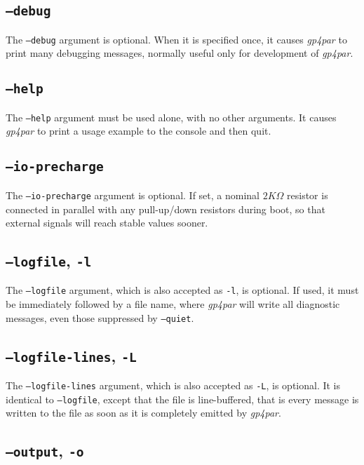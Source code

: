 \documentclass[11pt]{article}
\newcommand{\namestyle}[1]{\textit{#1}}
\begin{document}
\subsection{\texttt{--debug}}

The \texttt{--debug} argument is optional. When it is specified once, it causes \namestyle{gp4par} to print
many debugging messages, normally useful only for development of \namestyle{gp4par}.

\subsection{\texttt{--help}}

The \texttt{--help} argument must be used alone, with no other arguments. It causes \namestyle{gp4par} to print a usage
example to the console and then quit.

\subsection{\texttt{--io-precharge}}

The \texttt{--io-precharge} argument is optional. If set, a nominal $2K \Omega$ resistor is connected in parallel with any
pull-up/down resistors during boot, so that external signals will reach stable values sooner.

\subsection{\texttt{--logfile}, \texttt{-l}}

The \texttt{--logfile} argument, which is also accepted as \texttt{-l}, is optional. If used, it must be immediately
followed by a file name, where \namestyle{gp4par} will write all diagnostic messages, even those suppressed by
\texttt{--quiet}.

\subsection{\texttt{--logfile-lines}, \texttt{-L}}

The \texttt{--logfile-lines} argument, which is also accepted as \texttt{-L}, is optional. It is identical to
\texttt{--logfile}, except that the file is line-buffered, that is every message is written to the file as soon
as it is completely emitted by \namestyle{gp4par}.

\subsection{\texttt{--output}, \texttt{-o}}
\end{document}
